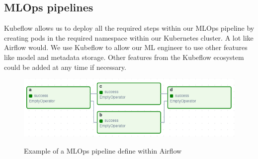 \subsection{MLOps pipelines}
Kubeflow allows us to deploy all the required steps within our MLOps pipeline by creating pods in the required namespace within our Kubernetes cluster.
A lot like Airflow would.
We use Kubeflow to allow our ML engineer to use other features like model and metadata storage.
Other features from the Kubeflow ecosystem could be added at any time if necessary.

\begin{figure}[!htbp]
    \centering
    \caption{Example of a MLOps pipeline define within Airflow}
    \includegraphics[scale=0.5]{images/project/data-ops-airflow-dag}
    \label{fig:project-ml-ops-airflow-dag}
\end{figure}

